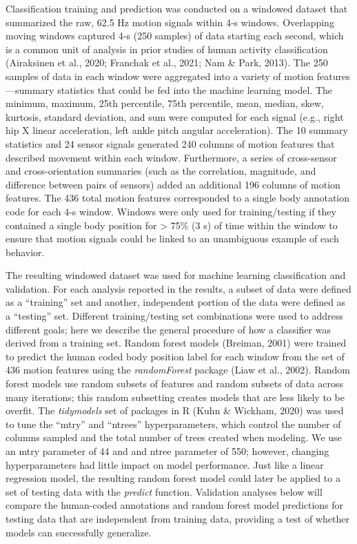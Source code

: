\documentclass[
  man]{apa6}
\begin{document}
Classification training and prediction was conducted on a windowed dataset that summarized the raw, 62.5 Hz motion signals within 4-s windows. Overlapping moving windows captured 4-s (250 samples) of data starting each second, which is a common unit of analysis in prior studies of human activity classification (Airaksinen et al., 2020; Franchak et al., 2021; Nam \& Park, 2013). The 250 samples of data in each window were aggregated into a variety of motion features---summary statistics that could be fed into the machine learning model. The minimum, maximum, 25th percentile, 75th percentile, mean, median, skew, kurtosis, standard deviation, and sum were computed for each signal (e.g., right hip X linear acceleration, left ankle pitch angular acceleration). The 10 summary statistics and 24 sensor signals generated 240 columns of motion features that described movement within each window. Furthermore, a series of cross-sensor and cross-orientation summaries (such as the correlation, magnitude, and difference between pairs of sensors) added an additional 196 columns of motion features. The 436 total motion features corresponded to a single body annotation code for each 4-s window. Windows were only used for training/testing if they contained a single body position for \textgreater{} 75\% (3 s) of time within the window to ensure that motion signals could be linked to an unambiguous example of each behavior.

The resulting windowed dataset was used for machine learning classification and validation. For each analysis reported in the results, a subset of data were defined as a ``training'' set and another, independent portion of the data were defined as a ``testing'' set. Different training/testing set combinations were used to address different goals; here we describe the general procedure of how a classifier was derived from a training set. Random forest models (Breiman, 2001) were trained to predict the human coded body position label for each window from the set of 436 motion features using the \emph{randomForest} package (Liaw et al., 2002). Random forest models use random subsets of features and random subsets of data across many iterations; this random subsetting creates models that are less likely to be overfit. The \emph{tidymodels} set of packages in R (Kuhn \& Wickham, 2020) was used to tune the ``mtry'' and ``ntrees'' hyperparameters, which control the number of columns sampled and the total number of trees created when modeling. We use an mtry parameter of 44 and and ntree parameter of 550; however, changing hyperparameters had little impact on model performance. Just like a linear regression model, the resulting random forest model could later be applied to a set of testing data with the \emph{predict} function. Validation analyses below will compare the human-coded annotations and random forest model predictions for testing data that are independent from training data, providing a test of whether models can successfully generalize.
\end{document}
